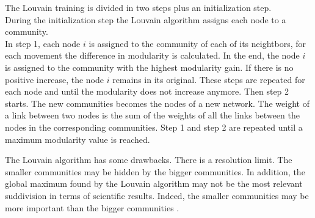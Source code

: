 \documentclass{article}
\begin{document}
The Louvain training is divided in two steps plus an initialization step.\\
During the initialization step the Louvain algorithm assigns each node to a community.\\
In step 1,  each node $i$ is assigned to the community of each of its neightbors, for each movement the difference in modularity is calculated.  In the end, the node $i$ is assigned to the community with the highest modularity gain. If there is no positive increase, the node $i$ remains in its original. These steps are repeated for each node and until the modularity does not increase anymore.
Then  step 2 starts. The new communities becomes the nodes of a new network.  The weight of a link between two nodes is the sum of the weights of all the links between the nodes in the corresponding communities.
Step 1 and step 2 are repeated until a maximum modularity value is reached. 

The Louvain algorithm has some drawbacks.
There is a resolution limit. The smaller communities may be hidden by the bigger communities. In addition, the global maximum found by the Louvain algorithm may not be the most relevant suddivision in terms of scientific results. Indeed, the smaller communities may be more important than the bigger communities \cite{Linhares2020}.\\
\end{document}
